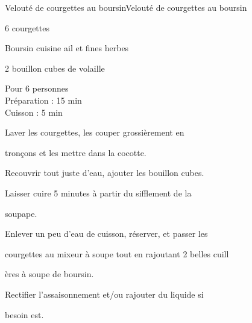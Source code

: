 \begin{recette}{Velouté de courgettes au boursin}{Velouté de courgettes au boursin}

\begin{ingredients}
6 courgettes\par
Boursin cuisine ail et fines herbes\par
2 bouillon cubes de volaille\par
\end{ingredients}

\begin{infos}
Pour 6 personnes\\
Préparation : 15 min\\
Cuisson : 5 min\\
\end{infos}

\begin{etapes}
\item Laver les courgettes, les couper grossièrement en
\item tronçons et les mettre dans la cocotte.
\item Recouvrir tout juste d’eau, ajouter les bouillon cubes.
\item Laisser cuire 5 minutes à partir du sifflement de la
\item soupape.
\item Enlever un peu d'eau de cuisson, réserver, et passer les
\item courgettes au mixeur à soupe tout en rajoutant 2 belles cuill
\item ères à soupe de boursin.
\item Rectifier l'assaisonnement et/ou rajouter du liquide si
\item besoin est.
\end{etapes}

\end{recette}
